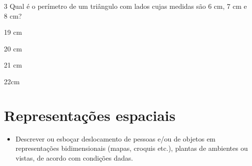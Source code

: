 




\num{3} Qual é o perímetro de um triângulo com lados cujas medidas são 6 cm,
7 cm e 8 cm?
\item 19 cm
\item 20 cm
\item 21 cm 
\item 22cm











\chapter{Representações
espaciais}

\begin{itemize}
\tightlist
\item
  Descrever ou esboçar deslocamento de pessoas e/ou de objetos em
  representações bidimensionais (mapas, croquis etc.), plantas de
  ambientes ou vistas, de acordo com condições dadas.
\end{itemize}

